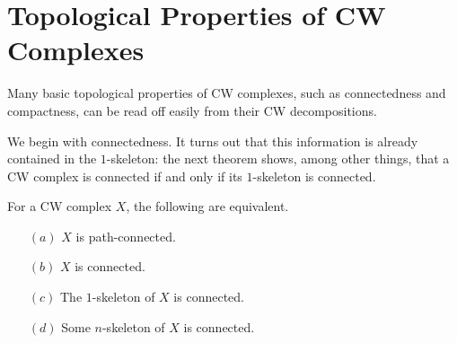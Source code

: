 \section{Topological Properties of CW Complexes}
Many basic topological properties of CW complexes, such as connectedness and compactness, can be read off easily from their CW decompositions.\par
We begin with connectedness. It turns out that this information is already contained in the $1$-skeleton: the next theorem shows, among other things, that a CW complex 
is connected if and only if its $1$-skeleton is connected.
\begin{theorem}\label{CW connected}
For a CW complex $X$, the following are equivalent.
\begin{itemize}
\item[$(a)$] $X$ is path-connected.
\item[$(b)$] $X$ is connected.
\item[$(c)$] The $1$-skeleton of $X$ is connected.
\item[$(d)$] Some $n$-skeleton of $X$ is connected.
\end{itemize}
\end{theorem}
